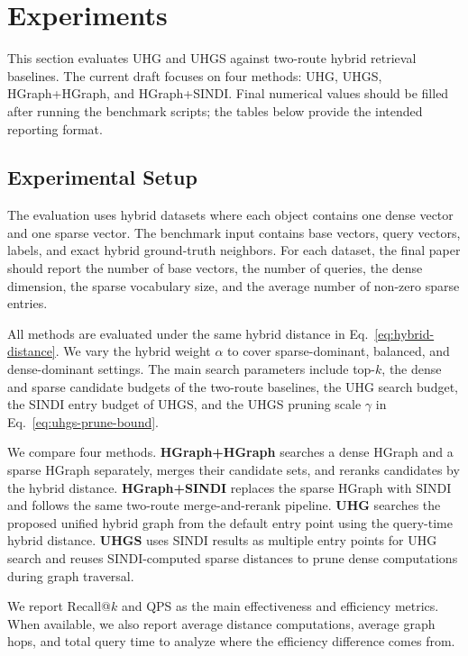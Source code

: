 \section{Experiments}
\label{sec:experimental}

This section evaluates UHG and UHGS against two-route hybrid retrieval baselines. The current draft focuses on four methods: UHG, UHGS, HGraph+HGraph, and HGraph+SINDI. Final numerical values should be filled after running the benchmark scripts; the tables below provide the intended reporting format.

\subsection{Experimental Setup}

The evaluation uses hybrid datasets where each object contains one dense vector and one sparse vector. The benchmark input contains base vectors, query vectors, labels, and exact hybrid ground-truth neighbors. For each dataset, the final paper should report the number of base vectors, the number of queries, the dense dimension, the sparse vocabulary size, and the average number of non-zero sparse entries.

All methods are evaluated under the same hybrid distance in Eq.~\eqref{eq:hybrid-distance}. We vary the hybrid weight $\alpha$ to cover sparse-dominant, balanced, and dense-dominant settings. The main search parameters include top-$k$, the dense and sparse candidate budgets of the two-route baselines, the UHG search budget, the SINDI entry budget of UHGS, and the UHGS pruning scale $\gamma$ in Eq.~\eqref{eq:uhgs-prune-bound}.

We compare four methods. \textbf{HGraph+HGraph} searches a dense HGraph and a sparse HGraph separately, merges their candidate sets, and reranks candidates by the hybrid distance. \textbf{HGraph+SINDI} replaces the sparse HGraph with SINDI and follows the same two-route merge-and-rerank pipeline. \textbf{UHG} searches the proposed unified hybrid graph from the default entry point using the query-time hybrid distance. \textbf{UHGS} uses SINDI results as multiple entry points for UHG search and reuses SINDI-computed sparse distances to prune dense computations during graph traversal.

We report Recall@$k$ and QPS as the main effectiveness and efficiency metrics. When available, we also report average distance computations, average graph hops, and total query time to analyze where the efficiency difference comes from.

